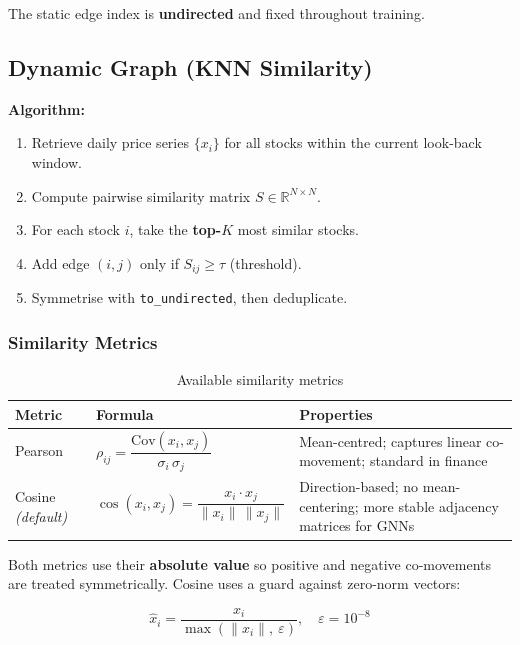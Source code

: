 \documentclass[12pt,a4paper]{article}
\newcommand{\codeinline}[1]{\texttt{\small #1}}
\begin{document}
The static edge index is \textbf{undirected} and fixed throughout training.

\subsection{Dynamic Graph (KNN Similarity)}

\textbf{Algorithm:}
\begin{enumerate}[leftmargin=2em]
  \item Retrieve daily price series $\{x_i\}$ for all stocks within the current look-back window.
  \item Compute pairwise similarity matrix $S \in \mathbb{R}^{N \times N}$.
  \item For each stock $i$, take the \textbf{top-$K$} most similar stocks.
  \item Add edge $(i, j)$ only if $S_{ij} \geq \tau$ (threshold).
  \item Symmetrise with \codeinline{to\_undirected}, then deduplicate.
\end{enumerate}

\subsubsection{Similarity Metrics}

\begin{table}[H]
\centering
\begin{tabular}{L{2.5cm} L{5.5cm} L{5cm}}
\toprule
\textbf{Metric} & \textbf{Formula} & \textbf{Properties} \\
\midrule
Pearson & $\rho_{ij} = \dfrac{\text{Cov}(x_i,x_j)}{\sigma_i\,\sigma_j}$ & Mean-centred; captures linear co-movement; standard in finance \\[0.8em]
Cosine \textit{(default)} & $\cos(x_i,x_j) = \dfrac{x_i \cdot x_j}{\|x_i\|\,\|x_j\|}$ & Direction-based; no mean-centering; more stable adjacency matrices for GNNs \\
\bottomrule
\end{tabular}
\caption{Available similarity metrics}
\end{table}

Both metrics use their \textbf{absolute value} so positive and negative co-movements are treated symmetrically.
Cosine uses a guard against zero-norm vectors:

\begin{equation}
  \hat{x}_i = \frac{x_i}{\max(\|x_i\|,\ \varepsilon)}, \quad \varepsilon = 10^{-8}
\end{equation}
\end{document}
